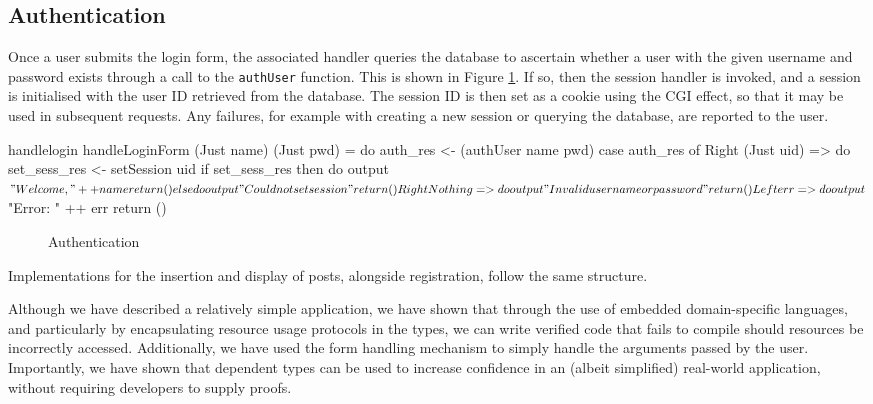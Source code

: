 \subsection{Authentication}

Once a user submits the login form, the associated handler queries the database
to ascertain whether a user with the given username and password exists through
a call to the \texttt{authUser} function. This is shown in Figure
\ref{fig:handlelogin}. If so, then the session handler is
invoked, and a session is initialised with the user ID retrieved from the
database. The session ID is then set as a cookie using the CGI effect, so that
it may be used in subsequent requests. Any failures, for example with creating
a new session or querying the database, are reported to the user.

\begin{SaveVerbatim}{handlelogin}
handleLoginForm (Just name) (Just pwd) = do
  auth_res <- (authUser name pwd)
  case auth_res of
    Right (Just uid) => do
      set_sess_res <- setSession uid
      if set_sess_res then do
        output $ "Welcome, " ++ name
        return ()
      else do
         output "Could not set session"
         return ()
    Right Nothing => do
      output "Invalid username or password"
      return ()
    Left err => do
      output $ "Error: " ++ err
      return ()
\end{SaveVerbatim}

\begin{figure}[h]
\caption{Authentication}
\label{fig:handlelogin}
\end{figure}

Implementations for the insertion and display of posts, alongside registration,
follow the same structure.

Although we have described a relatively simple application, we have shown that
through the use of embedded domain-specific languages, 
and particularly by encapsulating resource usage protocols in the types,
we can write verified
code that fails to compile should resources be incorrectly accessed.
Additionally, we have used the form handling mechanism to simply handle the
arguments passed by the user. Importantly, we have shown that dependent types
can be used to increase confidence in an (albeit simplified) real-world
application, without requiring developers to supply proofs.

